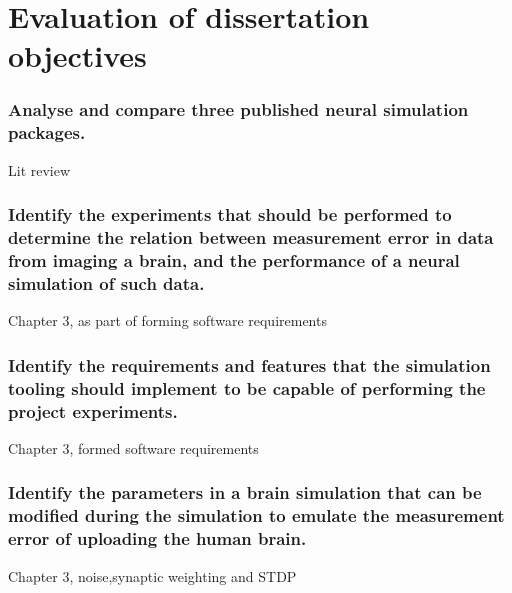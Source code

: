 
\newpage

\section{Evaluation of dissertation objectives}

\subsubsection{Analyse and compare three published neural simulation packages.}
Lit review

\subsubsection{Identify the experiments that should be performed to determine
      the relation between measurement error in data from imaging a brain, and
      the performance of a neural simulation of such data.}
Chapter 3, as part of forming software requirements

\subsubsection{Identify the requirements and features that the simulation
      tooling should implement to be capable of performing the project
      experiments.}
Chapter 3, formed software requirements

\subsubsection{Identify the parameters in a brain simulation that can be
      modified during the simulation to emulate the measurement error of
      uploading the human brain.}
Chapter 3, noise,synaptic weighting and STDP

